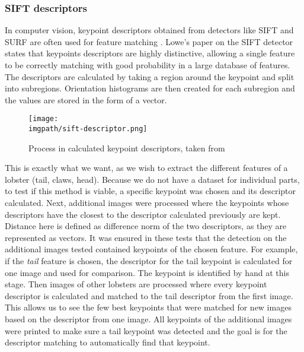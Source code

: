 \subsubsection{SIFT descriptors}
In computer vision, keypoint descriptors obtained from detectors like SIFT and SURF are often used for feature matching \cite{cv-matching}. Lowe's paper \cite{sift} on the SIFT detector states that keypoints descriptors are highly distinctive, allowing a single feature to be correctly matching with good probability in a large database of features. The descriptors are calculated by taking a region around the keypoint and split into subregions. Orientation histograms are then created for each subregion and the values are stored in the form of a vector.
\begin{figure}[H]
\texttt{[image: \\imgpath/sift-descriptor.png]}
\caption{Process in calculated keypoint descriptors, taken from \cite{fish-classification}}
\end{figure}
\noindent
This is exactly what we want, as we wish to extract the different features of a lobster (tail, claws, head). Because we do not have a dataset for individual parts, to test if this method is viable, a specific keypoint was chosen and its descriptor calculated. Next, additional images were processed where the keypoints whose descriptors have the closest to the descriptor calculated previously are kept. Distance here is defined as difference norm of the two descriptors, as they are represented as vectors. It was ensured in these tests that the detection on the additional images tested contained keypoints of the chosen feature. For example, if the \textit{tail} feature is chosen, the descriptor for the tail keypoint is calculated for one image and used for comparison. The keypoint is identified by hand at this stage. Then images of other lobsters are processed where every keypoint descriptor is calculated and matched to the tail descriptor from the first image. This allows us to see the few best keypoints that were matched for new images based on the descriptor from one image. All keypoints of the additional images were printed to make sure a tail keypoint was detected and the goal is for the descriptor matching to automatically find that keypoint.


